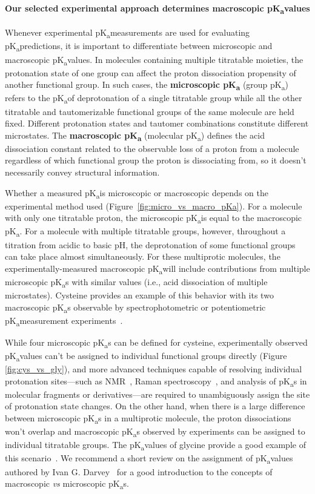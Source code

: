 \documentclass[9pt,lineno]{elife}
\newcommand{\pKa}{pK\textsubscript{a}}
\begin{document}
\paragraph{Our selected experimental approach determines macroscopic \pKa values}

Whenever experimental \pKa measurements are used for evaluating \pKa predictions, it is important to differentiate between microscopic and macroscopic \pKa values. 
In molecules containing multiple titratable moieties, the protonation state of one group can affect the proton dissociation propensity of another functional group.
In such cases, the \textbf{microscopic \pKa} (group \pKa) refers to the \pKa of deprotonation of a single titratable group while all the other titratable and tautomerizable functional groups of the same molecule are held fixed. 
Different protonation states and tautomer combinations constitute different microstates. 
The \textbf{macroscopic \pKa} (molecular \pKa) defines the acid dissociation constant related to the observable loss of a proton from a molecule regardless of which functional group the proton is dissociating from, so it doesn't necessarily convey structural information. 

Whether a measured \pKa is microscopic or macroscopic depends on the experimental method used (Figure~\ref{fig:micro_vs_macro_pKa}). 
For a molecule with only one titratable proton, the microscopic \pKa is equal to the macroscopic \pKa. 
For a molecule with multiple titratable groups, however, throughout a titration from acidic to basic pH, the deprotonation of some functional groups can take place almost simultaneously. 
For these multiprotic molecules, the experimentally-measured macroscopic \pKa will include contributions from multiple microscopic \pKa s with similar values (i.e., acid dissociation of multiple microstates). 
Cysteine provides an example of this behavior with its two macroscopic \pKa s observable by spectrophotometric or potentiometric \pKa measurement experiments~\citep{bodner_assigning_1986,darvey_assignment_1995}. 

While four microscopic \pKa s can be defined for cysteine, experimentally observed \pKa values can't be assigned to individual functional groups directly (Figure \ref{fig:cys_vs_gly}), and more advanced techniques capable of resolving individual protonation sites---such as NMR~\citep{bezencon_pka_2014}, Raman spectroscopy~\citep{elson_raman_1962, elbagerma_raman_2011}, and analysis of \pKa s in molecular fragments or derivatives---are required to unambiguously assign the site of protonation state changes. 
On the other hand, when there is a large difference between microscopic \pKa s in a multiprotic molecule, the proton dissociations won't overlap and macroscopic \pKa s observed by experiments can be assigned to individual titratable groups. 
The \pKa values of glycine provide a good example of this scenario~\citep{bodner_assigning_1986,elson_raman_1962,darvey_assignment_1995}. 
We recommend a short review on the assignment of \pKa values authored by Ivan G. Darvey~\citep{darvey_assignment_1995} for a good introduction to the concepts of macroscopic \emph{vs} microscopic \pKa s.
\end{document}

